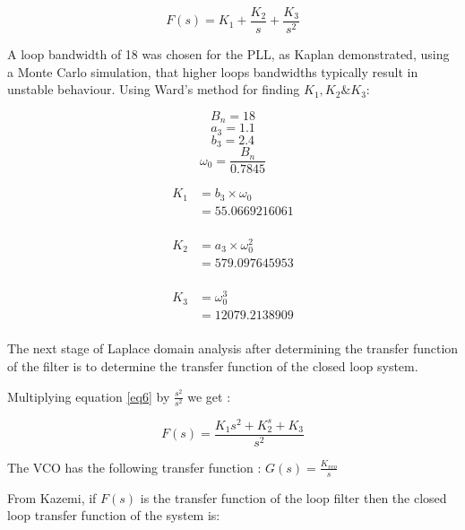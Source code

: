 \begin{equation} \label{eq6}
F(s) = K_1 + \frac{K_2}{s} + \frac{K_3}{s^2}
\end{equation}

A loop bandwidth of 18 was chosen for the \ac{PLL}, as Kaplan\cite{Kaplan} demonstrated, using a Monte Carlo simulation, that higher loops bandwidths typically result in unstable behaviour. 
Using Ward's method\cite{Ward} for finding $K_1,K_2\&K_3$:

$$B_n = 18$$
$$a_3=1.1$$
$$b_3=2.4$$
$$\omega_{0}=\frac{B_n}{0.7845}$$

\begin{equation} \label{eq3}
\begin{split}
K_1 & = b_3 \times \omega_{0}\\
    & = 55.0669216061\\
\end{split}
\end{equation}

\begin{equation} \label{eq4}
\begin{split}
K_2 & = a_3 \times \omega_{0}^2\\ 
    & = 579.097645953\\
\end{split}
\end{equation}

\begin{equation} \label{eq5}
\begin{split}
K_3 & = \omega_{0}^3\\
    & = 12079.2138909\\
\end{split}
\end{equation}


The next stage of Laplace domain analysis after determining the transfer function of the filter is to determine the transfer function of the closed loop system.

Multiplying equation \ref{eq6} by $\frac{s^2}{s^2}$ we get :

\begin{equation}
F(s) = \frac{K_1s^2 + K_2^s + K_3}{s^2}
\end{equation}

The \ac{VCO} has the following transfer function : $G(s) = \frac{K_{vco}}{s}$

From Kazemi, if  $F(s)$ is the transfer function of the loop filter\cite{KazemiPHD} then the closed loop transfer function  of the system is: 

